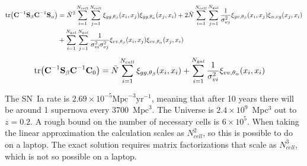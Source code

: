 \documentclass{article}
\begin{document}
\begin{align*}
\tr (\textbf{C}^{-1} \textbf{S}_\beta \textbf{C}^{-1} \textbf{S}_\alpha) & 
= \bar{N}^2  \sum_{i=1}^{N_{\text cell}} \sum_{j=1}^{N_{\text cell}} \xi_{gg,\theta_\beta}(x_i,x_j)\xi_{gg,\theta_\alpha}(x_j,x_i) 
+2 \bar{N}   \sum_{i=1}^{N_{\text cell}} \sum_{j=1}^{N_{\text gal}}\frac{1}{\sigma^{2}_{vj}}   \xi_{gv,\theta_\beta} (x_i,x_j)\xi_{\alpha,vg} (x_j,x_i)\\
& + \sum_{i=1}^{N_{\text gal}} \sum_{j=1}^{N_{\text gal}} \frac{1}{\sigma^{2}_{vi} \sigma^{2}_{vj}} \xi_{vv,\theta_\beta}(x_i,x_j)\xi_{vv,\theta_\alpha}(x_j,x_i) 
\end{align*}
\begin{align*}
\tr (\textbf{C}^{-1} \textbf{S}_\beta \textbf{C}^{-1} \textbf{C}_0) & 
=   \bar{N} \sum_{i=1}^{N_{\text cell}}  \xi_{gg,\theta_\beta}(x_i,x_i)  + \sum_{i=1}^{N_{\text gal}} \frac{1}{ \sigma^{2}_{vi}}\xi_{vv,\theta_\alpha}(x_i,x_i)
\end{align*}

The SN~Ia rate is $2.69 \times 10^{-5} \text{Mpc}^{-3} \text{yr}^{-1}$, meaning that after 10 years there
will be around 1 supernova every 3700~$\text{Mpc}^{3}$.
The Universe is $2.4 \times 10^9$~Mpc$^3$ out to $z=0.2$.  A rough bound on the number of necessary cells is $6\times 10^{5}$.
When taking the linear approximation the calculation scales as $N_{cell}^2$, so this is possible to do on a laptop.
The exact solution requires matrix factorizations that scale as $N_{cell}^3$, which is not so possible on a laptop.
\end{document}
